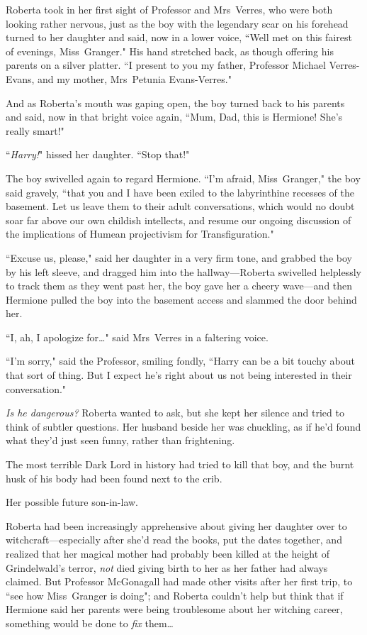 Roberta took in her first sight of Professor and Mrs~Verres, who were both looking rather nervous, just as the boy with the legendary scar on his forehead turned to her daughter and said, now in a lower voice, ``Well met on this fairest of evenings, Miss~Granger." His hand stretched back, as though offering his parents on a silver platter. ``I present to you my father, Professor Michael Verres-Evans, and my mother, Mrs~Petunia Evans-Verres."

And as Roberta's mouth was gaping open, the boy turned back to his parents and said, now in that bright voice again, ``Mum, Dad, this is Hermione! She's really smart!"

``\emph{Harry!}" hissed her daughter. ``Stop that!"

The boy swivelled again to regard Hermione. ``I'm afraid, Miss~Granger," the boy said gravely, ``that you and I have been exiled to the labyrinthine recesses of the basement. Let us leave them to their adult conversations, which would no doubt soar far above our own childish intellects, and resume our ongoing discussion of the implications of Humean projectivism for Transfiguration."

``Excuse us, please," said her daughter in a very firm tone, and grabbed the boy by his left sleeve, and dragged him into the hallway—Roberta swivelled helplessly to track them as they went past her, the boy gave her a cheery wave—and then Hermione pulled the boy into the basement access and slammed the door behind her.

``I, ah, I apologize for…" said Mrs~Verres in a faltering voice.

``I'm sorry," said the Professor, smiling fondly, ``Harry can be a bit touchy about that sort of thing. But I expect he's right about us not being interested in their conversation."

\emph{Is he dangerous?} Roberta wanted to ask, but she kept her silence and tried to think of subtler questions. Her husband beside her was chuckling, as if he'd found what they'd just seen funny, rather than frightening.

The most terrible Dark Lord in history had tried to kill that boy, and the burnt husk of his body had been found next to the crib.

Her possible future son-in-law.

Roberta had been increasingly apprehensive about giving her daughter over to witchcraft—especially after she'd read the books, put the dates together, and realized that her magical mother had probably been killed at the height of Grindelwald's terror, \emph{not} died giving birth to her as her father had always claimed. But Professor McGonagall had made other visits after her first trip, to ``see how Miss~Granger is doing"; and Roberta couldn't help but think that if Hermione said her parents were being troublesome about her witching career, something would be done to \emph{fix} them…

